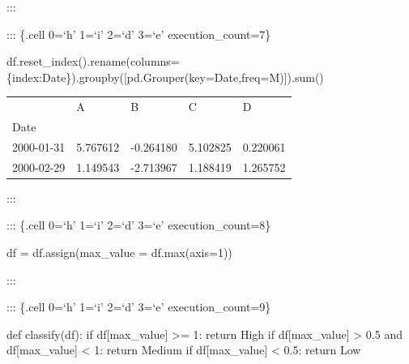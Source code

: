 \documentclass[
  letterpaper,
  DIV=11,
  numbers=noendperiod]{scrreport}
\newenvironment{Shaded}{\begin{snugshade}}{\end{snugshade}}
\newcommand{\BuiltInTok}[1]{\textcolor[rgb]{0.00,0.23,0.31}{#1}}
\newcommand{\ControlFlowTok}[1]{\textcolor[rgb]{0.00,0.23,0.31}{#1}}
\newcommand{\DecValTok}[1]{\textcolor[rgb]{0.68,0.00,0.00}{#1}}
\newcommand{\FloatTok}[1]{\textcolor[rgb]{0.68,0.00,0.00}{#1}}
\newcommand{\KeywordTok}[1]{\textcolor[rgb]{0.00,0.23,0.31}{#1}}
\newcommand{\NormalTok}[1]{\textcolor[rgb]{0.00,0.23,0.31}{#1}}
\newcommand{\OperatorTok}[1]{\textcolor[rgb]{0.37,0.37,0.37}{#1}}
\newcommand{\StringTok}[1]{\textcolor[rgb]{0.13,0.47,0.30}{#1}}
\begin{document}
:::

::: \{.cell 0=`h' 1=`i' 2=`d' 3=`e' execution\_count=7\}

\begin{Shaded}
\begin{Highlighting}[]
\NormalTok{df.reset\_index().rename(columns}\OperatorTok{=}\NormalTok{\{}\StringTok{\textquotesingle{}index\textquotesingle{}}\NormalTok{:}\StringTok{\textquotesingle{}Date\textquotesingle{}}\NormalTok{\}).groupby([pd.Grouper(key}\OperatorTok{=}\StringTok{\textquotesingle{}Date\textquotesingle{}}\NormalTok{,freq}\OperatorTok{=}\StringTok{\textquotesingle{}M\textquotesingle{}}\NormalTok{)]).}\BuiltInTok{sum}\NormalTok{()}
\end{Highlighting}
\end{Shaded}

\begin{longtable}[]{@{}lllll@{}}
\toprule()
& A & B & C & D \\
Date & & & & \\
\midrule()
\endhead
2000-01-31 & 5.767612 & -0.264180 & 5.102825 & 0.220061 \\
2000-02-29 & 1.149543 & -2.713967 & 1.188419 & 1.265752 \\
\bottomrule()
\end{longtable}

:::

::: \{.cell 0=`h' 1=`i' 2=`d' 3=`e' execution\_count=8\}

\begin{Shaded}
\begin{Highlighting}[]
\NormalTok{df }\OperatorTok{=}\NormalTok{ df.assign(max\_value }\OperatorTok{=}\NormalTok{ df.}\BuiltInTok{max}\NormalTok{(axis}\OperatorTok{=}\DecValTok{1}\NormalTok{))}
\end{Highlighting}
\end{Shaded}

:::

::: \{.cell 0=`h' 1=`i' 2=`d' 3=`e' execution\_count=9\}

\begin{Shaded}
\begin{Highlighting}[]
\KeywordTok{def}\NormalTok{ classify(df):}
    \ControlFlowTok{if}\NormalTok{ df[}\StringTok{\textquotesingle{}max\_value\textquotesingle{}}\NormalTok{] }\OperatorTok{\textgreater{}=} \DecValTok{1}\NormalTok{:}
        \ControlFlowTok{return} \StringTok{\textquotesingle{}High\textquotesingle{}}
    \ControlFlowTok{if}\NormalTok{ df[}\StringTok{\textquotesingle{}max\_value\textquotesingle{}}\NormalTok{] }\OperatorTok{\textgreater{}} \FloatTok{0.5} \KeywordTok{and}\NormalTok{ df[}\StringTok{\textquotesingle{}max\_value\textquotesingle{}}\NormalTok{] }\OperatorTok{\textless{}} \DecValTok{1}\NormalTok{:}
        \ControlFlowTok{return} \StringTok{\textquotesingle{}Medium\textquotesingle{}}
    \ControlFlowTok{if}\NormalTok{ df[}\StringTok{\textquotesingle{}max\_value\textquotesingle{}}\NormalTok{] }\OperatorTok{\textless{}} \FloatTok{0.5}\NormalTok{:}
        \ControlFlowTok{return} \StringTok{\textquotesingle{}Low\textquotesingle{}}
\end{Highlighting}
\end{Shaded}
\end{document}
